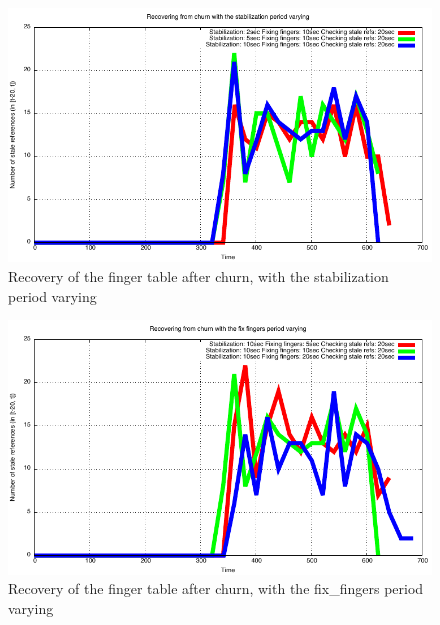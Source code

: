 \message{ !name(LSDS_project2_hayezl.tex)}\documentclass[a4paper, 11pt]{article}
\theoremstyle{plain}
\theoremstyle{definition}
\begin{document}
    \begin{figure}[h]
      \centering
      \includegraphics{plots/Recovery-SR-stabilization.pdf}
      \caption{Recovery of the finger table after churn, with the stabilization period varying}
      \label{fig:Rec-SR-stab}
    \end{figure}
    
    
    \begin{figure}[h]
      \centering
      \includegraphics{plots/Recovery-SR-fix-fingers.pdf}
      \caption{Recovery of the finger table after churn, with the fix\_fingers period varying}
      \label{fig:Rec-SR-fix-fingers}
    \end{figure}
    
\end{document}
